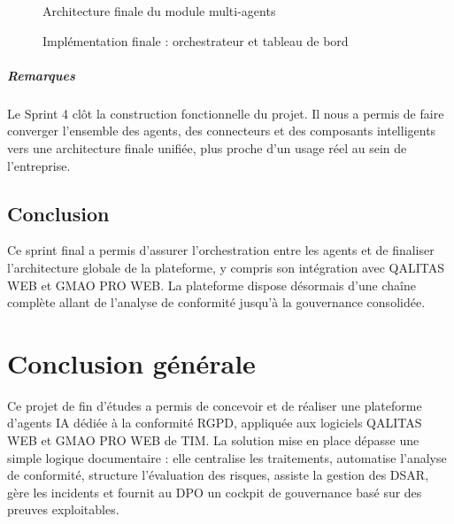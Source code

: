 \documentclass[12pt,a4paper]{report}
\begin{document}
\begin{figure}[H]
\centering
{}
\caption{Architecture finale du module multi-agents}
\label{fig:orchestration_sprint4}
\end{figure}

\begin{figure}[H]
\centering
{}
\caption{Implémentation finale : orchestrateur et tableau de bord}
\label{fig:realisation_sprint4}
\end{figure}

\paragraph{Remarques}

Le Sprint 4 clôt la construction fonctionnelle du projet. Il nous a permis de faire converger l'ensemble des agents, des connecteurs et des composants intelligents vers une architecture finale unifiée, plus proche d'un usage réel au sein de l'entreprise.

\section{Conclusion}

Ce sprint final a permis d'assurer l'orchestration entre les agents et de finaliser l'architecture globale de la plateforme, y compris son intégration avec QALITAS WEB et GMAO PRO WEB. La plateforme dispose désormais d'une chaîne complète allant de l'analyse de conformité jusqu'à la gouvernance consolidée.

\chapter*{Conclusion générale}

Ce projet de fin d'études a permis de concevoir et de réaliser une plateforme d'agents IA dédiée à la conformité RGPD, appliquée aux logiciels QALITAS WEB et GMAO PRO WEB de TIM. La solution mise en place dépasse une simple logique documentaire : elle centralise les traitements, automatise l'analyse de conformité, structure l'évaluation des risques, assiste la gestion des DSAR, gère les incidents et fournit au DPO un cockpit de gouvernance basé sur des preuves exploitables.
\end{document}
